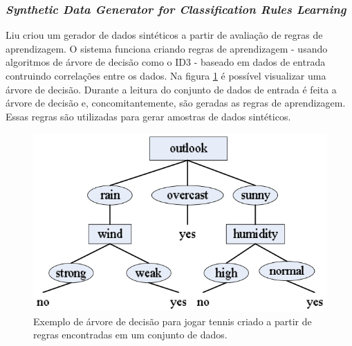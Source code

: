 \documentclass[
	12pt,				%
	openright,			%
	twoside,			%
	a4paper,			%
	english,			%
	brazil				%
	]{abntex2}
\begin{document}
	\subsubsection{\emph{Synthetic Data Generator for Classification Rules Learning}}
	Liu \cite{Liu2016} criou um gerador de dados sintéticos a partir de avaliação de regras de aprendizagem. O sistema funciona criando regras de aprendizagem - usando algoritmos de árvore de decisão como o ID3 - baseado em dados de entrada contruindo correlações entre os dados. Na figura \ref{fig:liu} é possível visualizar uma árvore de decisão. Durante a leitura do conjunto de dados de entrada é feita a árvore de decisão e, concomitantemente, são geradas as regras de aprendizagem. Essas regras são utilizadas para gerar amostras de dados sintéticos.
	\begin{figure}[h!]
		\centering
		\includegraphics[width=\linewidth]{./figures/TrabalhosRelacionados/Liu13.png}
		\caption{Exemplo de árvore de decisão para jogar tennis criado a partir de regras encontradas em um conjunto de dados.}
		\label{fig:liu}
	\end{figure}
\end{document}
